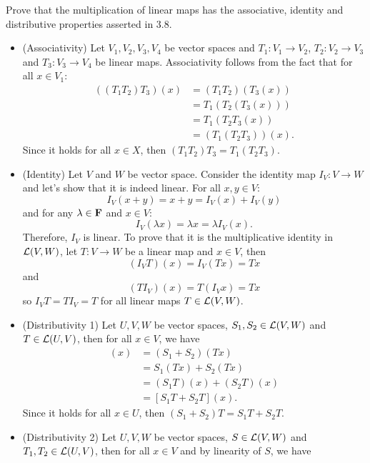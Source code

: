 \begin{exercise}
    Prove that the multiplication of linear maps has the associative, identity and distributive properties asserted in 3.8. \\
\end{exercise}

\begin{solution}
    \vspace{-0.25cm}
    \begin{itemize}
        \item (Associativity) Let $V_1, V_2, V_3, V_4$ be vector spaces and $T_1 : V_1 \to V_2$, $T_2 : V_2 \to V_3$ and $T_3 : V_3 \to V_4$ be linear maps. Associativity follows from the fact that for all $x \in V_1$:
        \begin{align*}
            ((T_1 T_2)T_3)(x) &= (T_1 T_2)(T_3(x)) \\
            &= T_1(T_2(T_3(x))) \\
            &= T_1(T_2T_3(x)) \\
            &= (T_1(T_2T_3))(x).
        \end{align*}
        Since it holds for all $x \in X$, then $(T_1 T_2)T_3 = T_1(T_2T_3)$.
        \item (Identity) Let $V$ and $W$ be vector space. Consider the identity map $I_V : V \to W$ and let's show that it is indeed linear. For all $x,y \in V$:
        $$I_V(x + y) = x + y = I_V(x) + I_V(y)$$
        and for any $\lambda \in \mathbf{F}$ and $x \in V$:
        $$I_V(\lambda x) = \lambda x = \lambda I_V(x).$$
        Therefore, $I_V$ is linear. To prove that it is the multiplicative identity in $\mathcal{L}(V,W)$, let $T: V \to W$ be a linear map and $x \in V$, then
        $$(I_V T)(x) = I_V(Tx) = Tx$$
        and
        $$(TI_V)(x) = T(I_Vx) = Tx$$
        so $I_V T = T I_V = T$ for all linear maps $T \in \mathcal{L}(V,W)$.
        \item (Distributivity 1) Let $U,V,W$ be vector spaces, $S_1, S_2 \in \mathcal{L}(V,W)$ and $T \in \mathcal{L}(U,V)$, then for all $x \in V$, we have
        \begin{align*}
            [(S_1 + S_2)T](x) &= (S_1 + S_2)(Tx) \\
            &= S_1(Tx) + S_2(Tx) \\
            &= (S_1 T)(x) + (S_2 T)(x) \\
            &= [S_1 T + S_2 T](x).
        \end{align*}
        Since it holds for all $x \in U$, then $(S_1 + S_2) T = S_1 T  + S_2 T$.
        \item (Distributivity 2) Let $U,V,W$ be vector spaces, $S \in \mathcal{L}(V,W)$ and $T_1, T_2 \in \mathcal{L}(U,V)$, then for all $x \in V$ and by linearity of $S$, we have

\end{itemize}
\end{solution}
